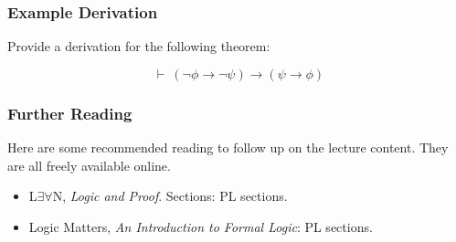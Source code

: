 \documentclass{beamer}
\begin{document}
\begin{frame}
	\frametitle{Example Derivation}
	
	Provide a derivation for the following theorem: 
	
	$$ \ \vdash \ (\lnot \phi \rightarrow \lnot \psi) \rightarrow (\psi \rightarrow \phi)$$
	
	\vspace{7cm}
	
\end{frame}

\begin{frame}
	\frametitle{Further Reading}
	
	Here are some recommended reading to follow up on the lecture content. They are all freely available online. 
	
	\vspace{0.5cm}
	
	\begin{itemize}
		\item L$\exists \forall$N, \emph{Logic and Proof}. Sections: PL sections.
		\item Logic Matters, \emph{An Introduction to Formal Logic}: PL sections.
	\end{itemize}
	
\end{frame}
\end{document}
